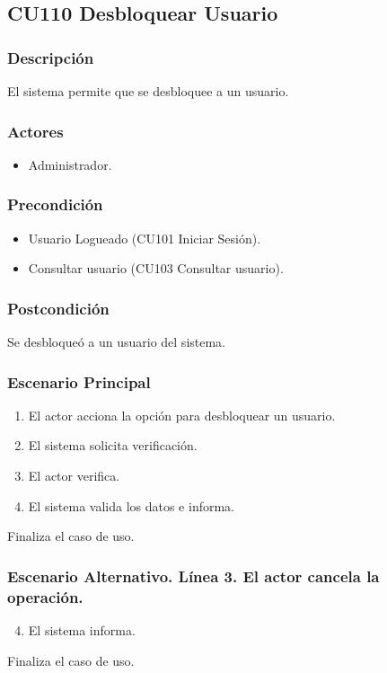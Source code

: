 \subsection{CU110 Desbloquear Usuario}
\subsubsection{Descripci\'{o}n}
El sistema permite que se desbloquee a un usuario.
\subsubsection{Actores}
\begin{itemize}
\item Administrador.
\end{itemize}
\subsubsection{Precondici\'{o}n}
\begin{itemize}
\item Usuario Logueado (CU101 Iniciar Sesi\'{o}n).
\item Consultar usuario (CU103 Consultar usuario).
\end{itemize}
\subsubsection{Postcondici\'{o}n}
Se desbloque\'{o} a un usuario del sistema.
\subsubsection{Escenario Principal}
\begin{enumerate}
\item El actor acciona la opci\'{o}n para desbloquear un usuario.
\item El sistema solicita verificaci\'{o}n.
\item El actor verifica.
\item El sistema valida los datos e informa.
\end{enumerate}
Finaliza el caso de uso.
\subsubsection{Escenario Alternativo. L\'{i}nea 3. El actor cancela la operaci\'{o}n.}
\begin{enumerate}
\setcounter{enumi}{3}
\item El sistema informa.
\end{enumerate}
Finaliza el caso de uso.